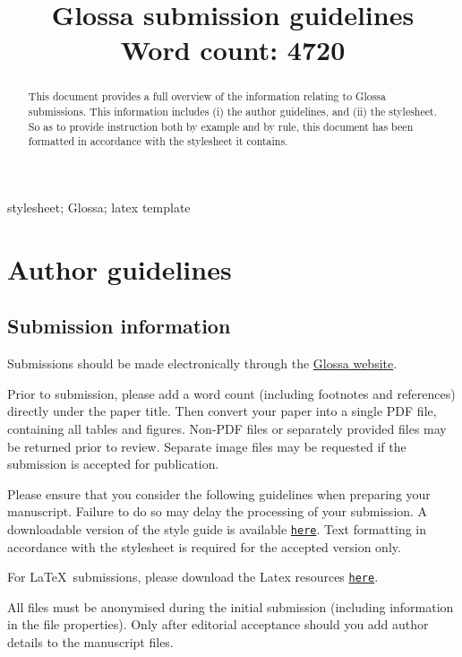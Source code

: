 \documentclass[charis,linguex,biblatex]{glossa}
\title[Glossa guidelines]{Glossa submission guidelines\\ \bigskip \large Word count: 4720}
\author[Paul \& Vanden Wyngaerd]%
{%
  \spauthor{Waltraud Paul\\ 
  \institute{CRLAO, CNRS-EHESS-INALCO}\\
  \small{%
  waltraud.paul@ehess.fr}
  }
  \AND
  \spauthor{Guido Vanden Wyngaerd \\
  \institute{KU Leuven}\\
  \small{%
  guido.vandenwyngaerd@kuleuven.be}
  }%
}
\begin{document}
\sffamily
\maketitle


\begin{abstract}
This document provides a full overview of the information relating to Glossa submissions. This information includes (i) the author guidelines, and (ii) the stylesheet. So as to provide instruction both by example and by rule, this document has been formatted in accordance with the stylesheet it contains.
\end{abstract}

\begin{keywords}
  stylesheet; Glossa; latex template
\end{keywords}

\rmfamily


\section{Author guidelines}
\subsection{Submission information}

Submissions should be made electronically through the \href{http://glossa.ubiquitypress.com}{Glossa website}. 

Prior to submission, please add a word count (including footnotes and references) directly under the paper title. Then convert your paper into a single PDF file, containing all tables and figures. Non-PDF files or separately provided files may be returned prior to review. Separate image files may be requested if the submission is accepted for publication.

Please ensure that you consider the following guidelines when preparing your manuscript. Failure to do so may delay the processing of your submission. A downloadable version of the style guide is available \href{https://github.com/guidovw/Glossalatex/blob/master/glossa-template.pdf}{\texttt{here}}. Text formatting in accordance with  the stylesheet is required for the accepted version only.


For \LaTeX\ submissions, please download the Latex resources \href{https://github.com/guidovw/Glossalatex}{\texttt{here}}.

All files must be anonymised during the initial submission (including information in the file properties). Only after editorial acceptance should you add author details to the manuscript files. 
\end{document}
